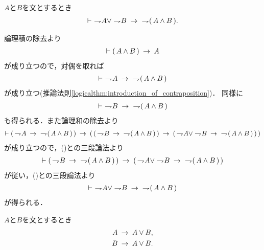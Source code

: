 	\begin{screen}
		\begin{logicalthm}
		\label{logicalthm:strong_De_Morgan_law_1}
			$A$と$B$を文とするとき
			\begin{align}
				\vdash\ \negation A \vee \negation B
				\rarrow\ \negation (\, A \wedge B\, ).
			\end{align}
		\end{logicalthm}
	\end{screen}
	
	\begin{prf}
		論理積の除去より
		\begin{align}
			\vdash (\, A \wedge B\, ) \rarrow A
		\end{align}
		が成り立つので，対偶を取れば
		\begin{align}
			\vdash\ \negation A \rarrow\ \negation (\, A \wedge B\, )
			\label{fom:strong_De_Morgan_law_1_1}
		\end{align}
		が成り立つ(推論法則\ref{logicalthm:introduction_of_contraposition})．
		同様に
		\begin{align}
			\vdash\ \negation B \rarrow\ \negation (\, A \wedge B\, )
			\label{fom:strong_De_Morgan_law_1_2}
		\end{align}
		も得られる．また論理和の除去より
		\begin{align}
			\vdash (\, \negation A \rarrow\ \negation (\, A \wedge B\, )\, )
			\rarrow (\, (\, \negation B \rarrow\ \negation (\, A \wedge B\, )\, )
			\rarrow (\, \negation A \vee \negation B 
			\rarrow\ \negation (\, A \wedge B\, )\, )\, )
		\end{align}
		が成り立つので，()との三段論法より
		\begin{align}
			\vdash (\, \negation B \rarrow\ \negation (\, A \wedge B\, )\, )
			\rarrow (\, \negation A \vee \negation B 
			\rarrow\ \negation (\, A \wedge B\, )\, )
		\end{align}
		が従い，()との三段論法より
		\begin{align}
			\vdash\ \negation A \vee \negation B 
			\rarrow\ \negation (\, A \wedge B\, )
		\end{align}
		が得られる．
		\QED
	\end{prf}
	
	\begin{screen}
		\begin{logicalaxm}[論理和の導入]
		\label{logicalaxm:introduction_of_disjunction}
			$A$と$B$を文とするとき
			\begin{align}
				A &\rarrow A \vee B, \\
				B &\rarrow A \vee B.
			\end{align}
		\end{logicalaxm}
	\end{screen}
	
